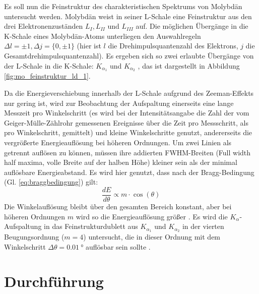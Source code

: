 Es soll nun die Feinstruktur des charakteristischen Spektrums von Molybdän untersucht werden. Molybdän weist in seiner L-Schale eine Feinstruktur aus den drei Elektronenzuständen $L_I, L_{II}$ und $L_{III}$ auf. Die möglichen Übergänge in die K-Schale eines Molybdän-Atoms unterliegen den Auswahlregeln $\Delta l = \pm 1, \Delta j = \{0, \pm 1\} $ (hier ist $l$ die Drehimpulsquantenzahl des Elektrons, $j$ die Gesamtdrehimpulsquantenzahl). Es ergeben sich so zwei erlaubte Übergänge von der L-Schale in die K-Schale: $K_{\alpha_1}$ und $K_{\alpha_2}$ \cite{LDfeinstruktur}, das ist dargestellt in Abbildung \ref{fig:mo_feinstruktur_ld_1}.



Da die Energieverschiebung innerhalb der L-Schale aufgrund des Zeeman-Effekts nur gering ist, wird zur Beobachtung der Aufspaltung einerseits eine lange Messzeit pro Winkelschritt (es wird bei der Intensitätsangabe die Zahl der vom Geiger-Mülle-Zählrohr gemessenen Ereignisse über die Zeit pro Messschritt, als pro Winkelschritt, gemittelt) und kleine Winkelschritte genutzt, andererseits die vergrößerte Energieauflösung bei höheren Ordnungen. Um zwei Linien als getrennt auflösen zu können, müssen ihre addierten FWHM-Breiten (Full width half maxima, volle Breite auf der halben Höhe) kleiner sein als der minimal auflösbare Energieabstand. Es wird hier genutzt, dass nach der Bragg-Bedingung (Gl. \ref{eq:braggbedingung}) gilt:
\[ \frac{dE}{d\theta} \propto m\cdot \cos{(\theta)}
\]
Die Winkelauflösung bleibt über den gesamten Bereich konstant, aber bei höheren Ordnungen $m$ wird so die Energieauflösung größer \cite{LDfeinstruktur}. Es wird die $K_\alpha$-Aufspaltung in das Feinstrukturdublett aus $K_{\alpha_1}$ und $K_{\alpha_2}$ in der vierten Beugungsordnung ($m=4$) untersucht, die in dieser Ordnung mit dem Winkelschritt $\Delta \theta = \SI{0,01}{\degree}$ auflösbar sein sollte \cite[2]{Versuchsanleitung428}.

\section{Durchführung}

